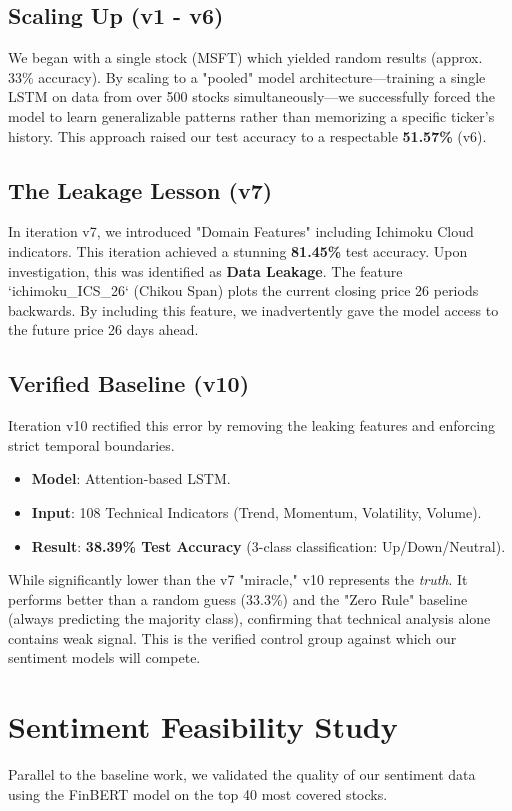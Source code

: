 \documentclass{article}
\begin{document}
\subsection{Scaling Up (v1 - v6)}
We began with a single stock (MSFT) which yielded random results (approx. 33\% accuracy). By scaling to a "pooled" model architecture—training a single LSTM on data from over 500 stocks simultaneously—we successfully forced the model to learn generalizable patterns rather than memorizing a specific ticker's history. This approach raised our test accuracy to a respectable \textbf{51.57\%} (v6).

\subsection{The Leakage Lesson (v7)}
In iteration v7, we introduced "Domain Features" including Ichimoku Cloud indicators. This iteration achieved a stunning \textbf{81.45\%} test accuracy. 
Upon investigation, this was identified as \textbf{Data Leakage}. The feature `ichimoku\_ICS\_26` (Chikou Span) plots the current closing price 26 periods backwards. By including this feature, we inadvertently gave the model access to the future price 26 days ahead.

\subsection{Verified Baseline (v10)}
Iteration v10 rectified this error by removing the leaking features and enforcing strict temporal boundaries. 
\begin{itemize}
    \item \textbf{Model}: Attention-based LSTM.
    \item \textbf{Input}: 108 Technical Indicators (Trend, Momentum, Volatility, Volume).
    \item \textbf{Result}: \textbf{38.39\% Test Accuracy} (3-class classification: Up/Down/Neutral).
\end{itemize}
While significantly lower than the v7 "miracle," v10 represents the \textit{truth}. It performs better than a random guess (33.3\%) and the "Zero Rule" baseline (always predicting the majority class), confirming that technical analysis alone contains weak signal. This is the verified control group against which our sentiment models will compete.

\section{Sentiment Feasibility Study}
Parallel to the baseline work, we validated the quality of our sentiment data using the FinBERT model on the top 40 most covered stocks.
\end{document}
